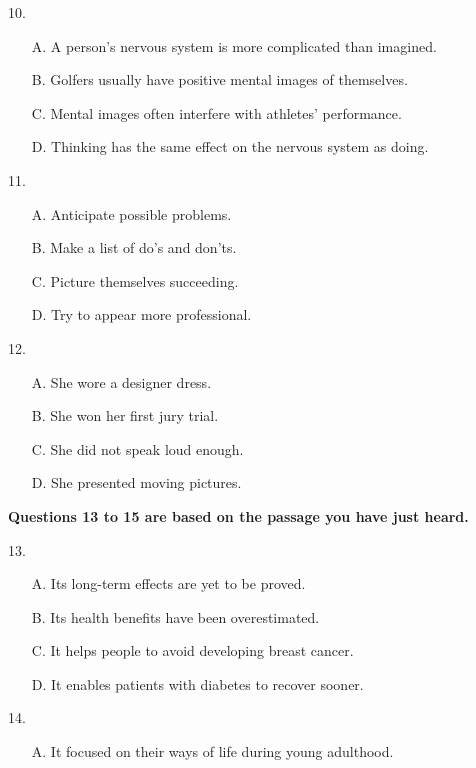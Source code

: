 \documentclass[UTF8,11pt]{ctexart}
\begin{document}
10.


\begin{itemize}[leftmargin=2em,itemsep=.2em,topsep=.4em]\item[A.] A person’s nervous system is more complicated than imagined.
\item[B.] Golfers usually have positive mental images of themselves.
\item[C.] Mental images often interfere with athletes’ performance.
\item[D.] Thinking has the same effect on the nervous system as doing.
\end{itemize}

11.


\begin{itemize}[leftmargin=2em,itemsep=.2em,topsep=.4em]\item[A.] Anticipate possible problems.
\item[B.] Make a list of do’s and don’ts.
\item[C.] Picture themselves succeeding.
\item[D.] Try to appear more professional.
\end{itemize}

12.


\begin{itemize}[leftmargin=2em,itemsep=.2em,topsep=.4em]\item[A.] She wore a designer dress.
\item[B.] She won her first jury trial.
\item[C.] She did not speak loud enough.
\item[D.] She presented moving pictures.
\end{itemize}

\textbf{Questions 13 to 15 are based on the passage you have just heard.}


13.


\begin{itemize}[leftmargin=2em,itemsep=.2em,topsep=.4em]\item[A.] Its long-term effects are yet to be proved.
\item[B.] Its health benefits have been overestimated.
\item[C.] It helps people to avoid developing breast cancer.
\item[D.] It enables patients with diabetes to recover sooner.
\end{itemize}

14.


\begin{itemize}[leftmargin=2em,itemsep=.2em,topsep=.4em]\item[A.] It focused on their ways of life during young adulthood.
\end{itemize}
\end{document}
